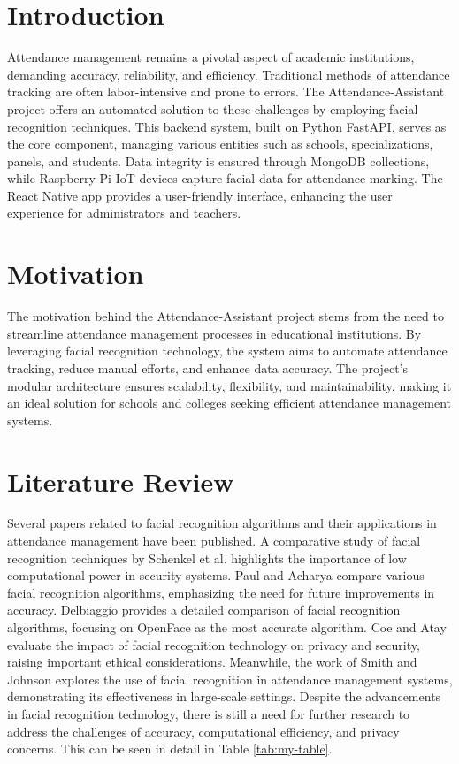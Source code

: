\documentclass[conference]{IEEEtran}
\begin{document}
\section{Introduction}
Attendance management remains a pivotal aspect of academic institutions, demanding accuracy, reliability, and efficiency. Traditional methods of attendance tracking are often labor-intensive and prone to errors. The Attendance-Assistant project offers an automated solution to these challenges by employing facial recognition techniques. This backend system, built on Python FastAPI, serves as the core component, managing various entities such as schools, specializations, panels, and students. Data integrity is ensured through MongoDB collections, while Raspberry Pi IoT devices capture facial data for attendance marking. The React Native app provides a user-friendly interface, enhancing the user experience for administrators and teachers.

\section{Motivation}
The motivation behind the Attendance-Assistant project stems from the need to streamline attendance management processes in educational institutions. By leveraging facial recognition technology, the system aims to automate attendance tracking, reduce manual efforts, and enhance data accuracy. The project's modular architecture ensures scalability, flexibility, and maintainability, making it an ideal solution for schools and colleges seeking efficient attendance management systems.

\section{Literature Review}
Several papers related to facial recognition algorithms and their applications in attendance management have been published. A comparative study of facial recognition techniques by Schenkel et al. \cite{1} highlights the importance of low computational power in security systems. Paul and Acharya \cite{2} compare various facial recognition algorithms, emphasizing the need for future improvements in accuracy. Delbiaggio \cite{3} provides a detailed comparison of facial recognition algorithms, focusing on OpenFace as the most accurate algorithm. Coe and Atay \cite{4} evaluate the impact of facial recognition technology on privacy and security, raising important ethical considerations. Meanwhile, the work of Smith and Johnson \cite{5} explores the use of facial recognition in attendance management systems, demonstrating its effectiveness in large-scale settings. Despite the advancements in facial recognition technology, there is still a need for further research to address the challenges of accuracy, computational efficiency, and privacy concerns.
This can be seen in detail in Table \ref{tab:my-table}.
\end{document}
